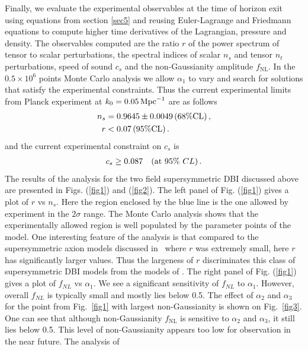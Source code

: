 \documentclass[a4paper,11pt]{article}
\def\non{\nonumber\\}
\def\non{\nonumber\\}
\begin{document}
  Finally, we evaluate the experimental observables at the time of horizon exit using equations from section \ref{sec5} and reusing Euler-Lagrange and Friedmann equations to compute higher time derivatives of the Lagrangian, pressure and density. The observables computed are the ratio $r$ of the power spectrum of tensor to scalar perturbations, the spectral indices of scalar $n_s$ and tensor $n_t$ perturbations, 
 speed of sound $c_s$ 
  and the non-Gaussianity amplitude $f_\text{NL}$.
    In the $0.5 \times 10^6$ points Monte Carlo analysis we allow $\alpha_1$ to vary
  and search for solutions that satisfy the experimental constraints. Thus the
  current experimental limits from Planck experiment at $k_0=0.05\, {\rm Mpc}^{-1}$ are as follows~\cite{Adam:2015rua,Ade:2015lrj,Array:2015xqh}
  \begin{align}
  	n_s& = 0.9645 \pm 0.0049\, (68\% {\rm CL})\,, \non
  	r & <0.07\, (95\% {\rm CL})\,.
  	\label{data}
  \end{align}
  and the current experimental constraint on $c_s$ is~\cite{Ade:2015lrj}
  \begin{align}
  	c_s\geq 0.087~~~({\rm at ~}95\% ~CL)\,.
  	\label{sound}
  \end{align}
  The results of the analysis for the two field supersymmetric DBI discussed above
  are presented in Figs. (\ref{fig1}) and (\ref{fig2}). The left panel of Fig. (\ref{fig1}) gives
  a plot of $r$ vs $n_s$. Here the region enclosed by the blue line is the one allowed by experiment in the $2\sigma$ range.
  The Monte Carlo analysis shows that the experimentally allowed region is well populated by the parameter points of the model.
  One interesting feature of the analysis is that compared to the
  supersymmetric axion models discussed in~\cite{Nath:2017ihp}
  where $r$ was extremely small, here $r$ has significantly
  larger values. Thus the largeness of $r$ discriminates this class of supersymmetric DBI models from the models
  of \cite{Nath:2017ihp}.
  The right panel of Fig. (\ref{fig1}) gives a plot of $f_{NL}$ vs $\alpha_1$. We see a significant sensitivity
  of $f_{NL}$ to $\alpha_1$. However, overall $f_{NL}$ is typically small and mostly lies below 0.5. The effect of $\alpha_2$ and $\alpha_3$ for the point from Fig.~\ref{fig1} with largest non-Gaussianity is shown on Fig.~\ref{fig3}. One can see that although non-Gaussianity $f_\text{NL}$ is sensitive to $\alpha_2$ and $\alpha_3$, it still lies below 0.5. This level
  of non-Gaussianity appears too low for observation in the near future. The analysis of~\cite{Komatsu:2001rj,Komatsu:2003fd,Verde:1999ij}
\end{document}
